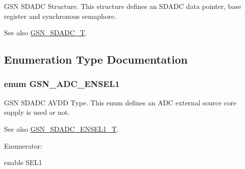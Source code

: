 GSN SDADC Structure. This structure defines an SDADC data pointer, base register and synchronous semaphore. 

\begin{DoxySeeAlso}{See also}
\hyperlink{a00652_ga24812a09f6831a451bf951bbc956b2b9}{GSN\_\-SDADC\_\-T}. 
\end{DoxySeeAlso}


\subsection{Enumeration Type Documentation}
\hypertarget{a00652_ga7c8cd0e1bbc6163fd01b12c7f31f0550}{
\subsubsection[{GSN\_\-ADC\_\-ENSEL1}]{\setlength{\rightskip}{0pt plus 5cm}enum {\bf GSN\_\-ADC\_\-ENSEL1}}}
\label{a00652_ga7c8cd0e1bbc6163fd01b12c7f31f0550}


GSN SDADC AVDD Type. This enum defines an ADC external source core supply is used or not. 

\begin{DoxySeeAlso}{See also}
\hyperlink{a00652_ga9cf5d5c5ebe5edb5cda45eb9a6e466ef}{GSN\_\-SDADC\_\-ENSEL1\_\-T}. 
\end{DoxySeeAlso}
\begin{Desc}
\item[Enumerator: ]\par
\begin{description}
\item[{\em 
\hypertarget{a00652_gga7c8cd0e1bbc6163fd01b12c7f31f0550a7f18f093a813a23aac7a7602cec80767}{
GSN\_\-SDADC\_\-ENSEL1\_\-DISABLE}
\label{a00652_gga7c8cd0e1bbc6163fd01b12c7f31f0550a7f18f093a813a23aac7a7602cec80767}
}]\item[{\em 
\hypertarget{a00652_gga7c8cd0e1bbc6163fd01b12c7f31f0550a20f123d417c8be249c802178812e6f25}{
GSN\_\-SDADC\_\-ENSEL1\_\-ENABLE}
\label{a00652_gga7c8cd0e1bbc6163fd01b12c7f31f0550a20f123d417c8be249c802178812e6f25}
}]enable SEL1 \end{description}
\end{Desc}



